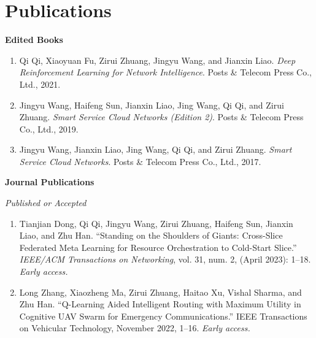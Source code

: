 \documentclass[letterpaper,11pt]{article}
\newcommand{\contentlength}{5.5in}
\begin{document}
	\section{\textbf{Publications}}
	\begin{tcolorbox}[flush right,breakable,colback=white,colframe=white,width=\contentlength]
		\textbf{Edited Books}
		\begin{enumerate}[itemsep=0mm]
			\item Qi Qi, Xiaoyuan Fu, Zirui Zhuang, Jingyu Wang, and Jianxin Liao. \textit{Deep Reinforcement Learning for Network Intelligence}. Posts \& Telecom Press Co., Ltd., 2021.
			\item Jingyu Wang, Haifeng Sun, Jianxin Liao, Jing Wang, Qi Qi, and Zirui Zhuang. \textit{Smart Service Cloud Networks (Edition 2)}. Posts \& Telecom Press Co., Ltd., 2019.
			\item Jingyu Wang, Jianxin Liao, Jing Wang, Qi Qi, and Zirui Zhuang. \textit{Smart Service Cloud Networks}. Posts \& Telecom Press Co., Ltd., 2017.
		\end{enumerate}
	
		\textbf{Journal Publications}
		
		\textit{Published or Accepted}
		\begin{enumerate}[itemsep=0mm]
			\item Tianjian Dong, Qi Qi, Jingyu Wang, Zirui Zhuang, Haifeng Sun, Jianxin Liao, and Zhu Han. “Standing on the Shoulders of Giants: Cross-Slice Federated Meta Learning for Resource Orchestration to Cold-Start Slice.” \textit{IEEE/ACM Transactions on Networking}, vol. 31, num. 2, (April 2023): 1–18. \textit{Early access.}
			
			\item Long Zhang, Xiaozheng Ma, Zirui Zhuang, Haitao Xu, Vishal Sharma, and Zhu Han. “Q-Learning Aided Intelligent Routing with Maximum Utility in Cognitive UAV Swarm for Emergency Communications.” IEEE Transactions on Vehicular Technology, November 2022, 1–16. \textit{Early access.}
			

\end{enumerate}
\end{tcolorbox}
\end{document}

